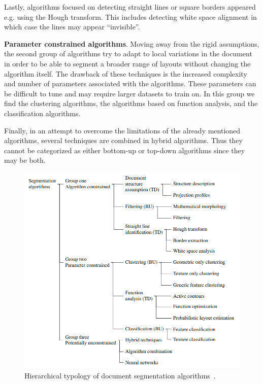 \documentclass[oneside, english, bibtex]{kththesis}
\begin{document}
Lastly, algorithms focused on detecting straight lines or square borders appeared e.g. using the Hough transform. This includes detecting white space alignment in which case the lines may appear “invisible”.

\textbf{Parameter constrained algorithms}. Moving away from the rigid assumptions, the second group of algorithms try to adapt to local variations in the document in order to be able to segment a broader range of layouts without changing the algorithm itself. The drawback of these techniques is the increased complexity and number of parameters associated with the algorithms. These parameters can be difficult to tune and may require larger datasets to train on. In this group we find the clustering algorithms, the algorithms based on function analysis, and the classification algorithms.

Finally, in an attempt to overcome the limitations of the already mentioned algorithms, several techniques are combined in hybrid algorithms. Thus they cannot be categorized as either bottom-up or top-down algorithms since they may be both.

\begin{figure}[H]
  \begin{center}
    \includegraphics[width=1.0\textwidth]{figures/classicalalgs.png}
  \end{center}
  \caption{Hierarchical typology of document segmentation algorithms~\cite{ESKENAZI20171}.   }
  \label{fig:classicalgs}
\end{figure}
\end{document}
